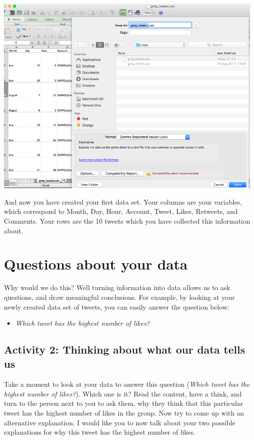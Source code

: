 \documentclass[]{book}
\providecommand{\tightlist}{%
  \setlength{\itemsep}{0pt}\setlength{\parskip}{0pt}}
\theoremstyle{definition}
\theoremstyle{definition}
\theoremstyle{definition}
\theoremstyle{remark}
\begin{document}
\includegraphics{imgs/save_tweets.png}

And now you have created your first data set. Your columns are your
variables, which correspond to Month, Day, Hour, Account, Tweet, Likes,
Retweets, and Comments. Your rows are the 10 tweets which you have
collected this information about.

\hypertarget{questions-about-your-data}{%
\section{Questions about your data}\label{questions-about-your-data}}

Why would we do this? Well turning information into data allows us to
ask questions, and draw meaningful conclusions. For example, by looking
at your newly created data set of tweets, you can easily answer the
question below:

\begin{itemize}
\tightlist
\item
  \emph{Which tweet has the highest number of likes?}
\end{itemize}

\hypertarget{activity-2-thinking-about-what-our-data-tells-us}{%
\subsection{Activity 2: Thinking about what our data tells
us}\label{activity-2-thinking-about-what-our-data-tells-us}}

Take a moment to look at your data to answer this question (\emph{Which
tweet has the highest number of likes?}). Which one is it? Read the
content, have a think, and turn to the person next to you to ask them,
why they think that this particular tweet has the highest number of
likes in the group. Now try to come up with an alternative explanation.
I would like you to now talk about your two possible explanations for
why this tweet has the highest number of likes.
\end{document}
